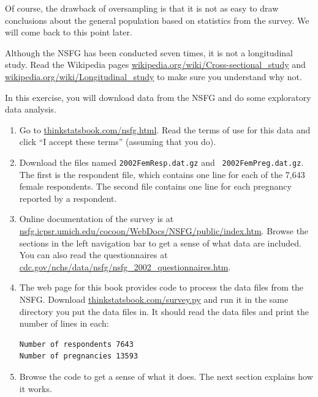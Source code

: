\documentclass[12pt]{book}
\begin{document}
Of course, the drawback of oversampling is that it is not as easy
to draw conclusions about the general population based on statistics
from the survey.  We will come back to this point later.

\begin{ex}

Although the NSFG has been conducted seven times, it is not a
longitudinal study.  Read the Wikipedia pages
\url{wikipedia.org/wiki/Cross-sectional_study}
and
\url{wikipedia.org/wiki/Longitudinal_study}
to make sure you understand why not.

\end{ex}

\begin{ex}

In this exercise, you will download data from the NSFG and do some
exploratory data analysis.

\begin{enumerate}

\item Go to \url{thinkstatsbook.com/nsfg.html}.  Read the terms of
use for this data and click ``I accept these terms'' (assuming that you do).

\item Download the files named {\tt 2002FemResp.dat.gz} and {\tt
  2002FemPreg.dat.gz}.  The first is the respondent file, which contains
  one line for each of the 7,643 female respondents.
  The second file contains one line for each pregnancy reported by a
  respondent.

\item Online documentation of the survey is at
  \url{nsfg.icpsr.umich.edu/cocoon/WebDocs/NSFG/public/index.htm}.
  Browse the sections in the left navigation bar to get a sense of
  what data are included.  You can also read the questionnaires
  at \url{cdc.gov/nchs/data/nsfg/nsfg_2002_questionnaires.htm}.

\item The web page for this book provides code to process the data
  files from the NSFG.  Download \url{thinkstatsbook.com/survey.py}
  and run it in the same directory you put the data files in.  It
  should read the data files and print the number of lines in each:

\begin{verbatim}
Number of respondents 7643
Number of pregnancies 13593
\end{verbatim}

\item Browse the code to get a sense of what it does.  The next
section explains how it works.

\end{enumerate}

\end{ex}
\end{document}
